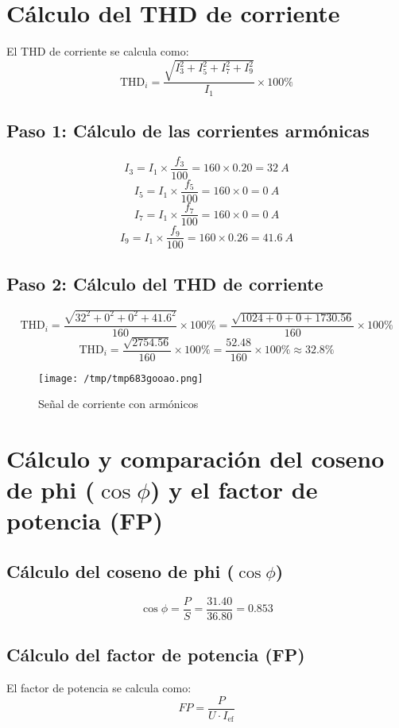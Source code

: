\documentclass[a4paper,10pt]{article}
\begin{document}
\begin{Form}
\section{Cálculo del THD de corriente}
El THD de corriente se calcula como:
\[
\text{THD}_i = \frac{\sqrt{I_3^2 + I_5^2 + I_7^2 + I_9^2}}{I_1} \times 100 \%
\]

\subsection{Paso 1: Cálculo de las corrientes armónicas}
\[
I_3 = I_1 \times \frac{f_3}{100} = 160 \times 0.20 = \SI{32}{A}
\]
\[
I_5 = I_1 \times \frac{f_5}{100} = 160 \times 0 = \SI{0}{A}
\]
\[
I_7 = I_1 \times \frac{f_7}{100} = 160 \times 0 = \SI{0}{A}
\]
\[
I_9 = I_1 \times \frac{f_9}{100} = 160 \times 0.26 = \SI{41.6}{A}
\]

\subsection{Paso 2: Cálculo del THD de corriente}
\[
\text{THD}_i = \frac{\sqrt{32^2 + 0^2 + 0^2 + 41.6^2}}{160} \times 100 \% = \frac{\sqrt{1024 + 0 + 0 + 1730.56}}{160} \times 100 \% 
\]
\[
\text{THD}_i = \frac{\sqrt{2754.56}}{160} \times 100 \% = \frac{52.48}{160} \times 100 \% \approx 32.8 \%
\]

\begin{figure}[H]
                
                \texttt{[image: /tmp/tmp683gooao.png]}
                \caption{Señal de corriente con armónicos}
                
                \label{fig:dfassssdfsa}
                \end{figure}
                


\section{Cálculo y comparación del coseno de phi (\(\cos \phi\)) y el factor de potencia (FP)}

\subsection{Cálculo del coseno de phi (\(\cos \phi\))}
\[
\cos \phi = \frac{P}{S} = \frac{31.40}{36.80} = 0.853
\]

\subsection{Cálculo del factor de potencia (FP)}
El factor de potencia se calcula como:
\[
FP = \frac{P}{U \cdot I_{\text{ef}}}
\]


\end{Form}
\end{document}
